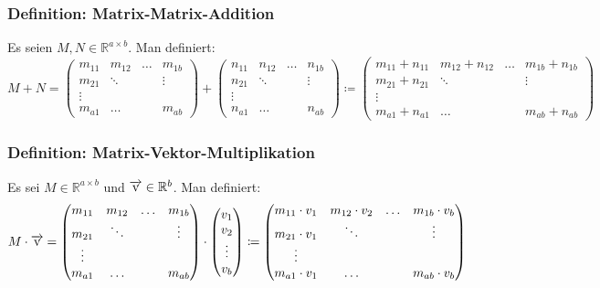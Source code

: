 \documentclass{article}
\begin{document}
  	\subsubsection{Definition: Matrix-Matrix-Addition}
  	Es seien $M, N \in \mathbb{R}^{a \times b}$. Man definiert: 
  	\begin{equation*}
  		M + N = 
  		\begin{pmatrix}
  			m_{11}&m_{12}&\ldots&m_{1b} \\
  			m_{21}&\ddots&&\vdots \\
  			\vdots&&& \\
  			m_{a1}&\ldots&&m_{ab}
  		\end{pmatrix}
  		+
  		\begin{pmatrix}
  			n_{11}&n_{12}&\ldots&n_{1b} \\
  			n_{21}&\ddots&&\vdots \\
  			\vdots&&& \\
  			n_{a1}&\ldots&&n_{ab}
  		\end{pmatrix}
  		\coloneqq
  		\begin{pmatrix}
  			m_{11} + n_{11}&m_{12} + n_{12}&\ldots&m_{1b} + n_{1b} \\
  			m_{21} + n_{21}&\ddots&&\vdots \\
  			\vdots&&& \\
  			m_{a1} + n_{a1}&\ldots&&m_{ab} + n_{ab}
  		\end{pmatrix}
  	\end{equation*}
  	
  	\subsubsection{Definition: Matrix-Vektor-Multiplikation}
  	Es sei $M \in \mathbb{R}^{a \times b}$ und $\overrightarrow{\rm v} \in \mathbb{R}^b$. Man definiert: 
  	\begin{equation*}
  		M \cdot \overrightarrow{\rm v} = 
  		\begin{pmatrix}
  			m_{11}&m_{12}&\ldots&m_{1b} \\
  			m_{21}&\ddots&&\vdots \\
  			\vdots&&& \\
  			m_{a1}&\ldots&&m_{ab}
  		\end{pmatrix}
  		\cdot
  		\begin{pmatrix}
  			v_1 \\
  			v_2 \\
  			\vdots \\
  			v_b
  		\end{pmatrix}
  		\coloneqq
  		\begin{pmatrix}
  			m_{11} \cdot v_1&m_{12} \cdot v_2&\ldots&m_{1b} \cdot v_b \\
  			m_{21} \cdot v_1&\ddots&&\vdots \\
  			\vdots&&& \\
  			m_{a1} \cdot v_1&\ldots&&m_{ab} \cdot v_b
  		\end{pmatrix}
  	\end{equation*}
  
\end{document}
